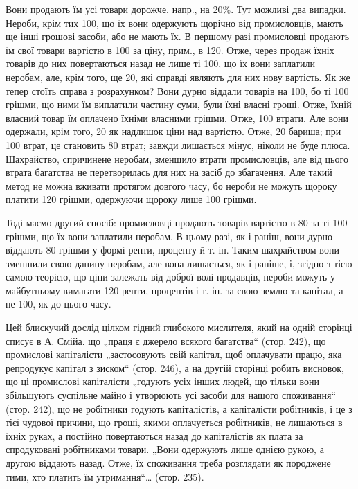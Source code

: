 \parcont{}  %
Вони продають їм усі товари дорожче, напр., на 20\%. Тут можливі два випадки. Нероби, крім
тих 100, що їх вони одержують щорічно від промисловців, мають ще інші грошові засоби, або
не мають їх. В першому разі промисловці продають їм свої товари вартістю в 100 за ціну,
прим., в 120. Отже, через продаж їхніх товарів до них повертаються назад не лише ті 100, що їх вони заплатили неробам, але, крім того, ще 20, які справді являють для них
нову вартість. Як же тепер стоїть справа з розрахунком? Вони дурно віддали товарів на 100,
бо ті 100 грішми, що ними їм виплатили частину суми, були їхні власні гроші. Отже, їхній
власний товар їм оплачено їхніми власними грішми. Отже, 100 втрати. Але вони одержали,
крім того, 20 як надлишок ціни над вартістю. Отже, 20 бариша; при 100
втрат, це становить 80 втрат; завжди лишається мінус, ніколи не буде плюса. Шахрайство,
спричинене неробам, зменшило втрати промисловців, але від цього втрата багатства не перетворилась
для них на засіб до збагачення. Але такий метод не можна вживати протягом довгого часу, бо нероби не
можуть щороку платити 120 грішми, одержуючи щороку лише 100 грішми.

Тоді маємо другий спосіб: промисловці продають товарів вартістю в 80 за ті 100
грішми, що їх вони заплатили неробам. В цьому разі, як і раніш, вони дурно віддають 80
грішми у формі ренти, проценту й т. ін. Таким шахрайством вони зменшили свою данину неробам, але
вона лишається, як і раніше, і, згідно з тією самою теорією, що ціни залежать від доброї волі
продавців, нероби можуть у майбутньому вимагати 120 ренти, процентів і т. ін. за свою
землю та капітал, а не 100, як до цього часу.

Цей блискучий дослід цілком гідний глибокого мислителя, який на одній сторінці списує в А. Смійа. що
„праця є джерело всякого багатства“ (стор. 242), що промислові капіталісти „застосовують свій
капітал, щоб оплачувати працю, яка репродукує капітал з зиском“ (стор. 246), а на другій сторінці
робить висновок, що ці промислові капіталісти „годують
усіх інших людей, що тільки вони збільшують суспільне майно і утворюють усі засоби для нашого
споживання“ (стор. 242), що не робітники годують капіталістів, а капіталісти робітників, і це з тієї
чудової причини, що гроші, якими оплачується робітників, не лишаються в їхніх руках, а постійно
повертаються назад до капіталістів як плата за спродуковані робітниками товари. „Вони одержують лише
однією рукою, а другою віддають назад. Отже, їх споживання треба розглядати як породжене тими, хто
платить їм утримання“\dots{} (стор. 235).

